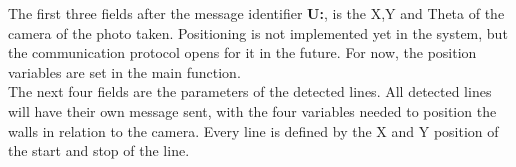 The first three fields after the message identifier \textbf{U:}, is the X,Y and Theta of the camera of the photo taken. Positioning is not implemented yet in the system, but the communication protocol opens for it in the future. For now, the position variables are set in the main function.\\

The next four fields are the parameters of the detected lines. All detected lines will have their own message sent, with the four variables needed to position the walls in relation to the camera. Every line is defined by the X and Y position of the start and stop of the line.

















